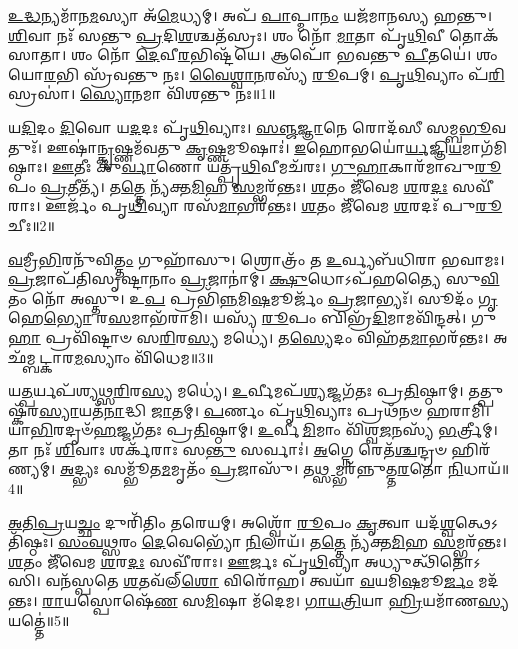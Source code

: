 \setcounter{anuvakam}{0}

\-\ul{𑌉}\-\-\ul{𑌦𑍍𑌧}\-𑌨𑍍𑌯𑌮𑌾᳴𑌨\-\ul{𑌮}\-𑌸𑍍𑌯𑌾 𑌅᳴\-\ul{𑌮𑍇}\-𑌧𑍍𑌯𑌮𑍍।
𑌅𑌪᳴ \ul{𑌪𑌾}\-𑌪𑍍𑌮𑌾\-\ul{𑌨𑌂} 𑌯𑌜᳴𑌮𑌾𑌨𑌸𑍍𑌯 𑌹𑌨𑍍𑌤𑍁।
\-\ul{𑌶𑌿}\-𑌵𑌾 𑌨𑌃᳴ 𑌸𑌨𑍍𑌤𑍁 \ul{𑌪𑍍𑌰}\-𑌦𑌿\-\ul{𑌶}\-𑌶𑍍𑌚𑌤᳴𑌸𑍍𑌰𑌃।
𑌶𑌂 𑌨𑍋᳴ \ul{𑌮𑌾}\-𑌤𑌾 𑌪𑍃᳴\-\ul{𑌥𑌿}\-𑌵𑍀 𑌤𑍋𑌕᳴𑌸𑌾𑌤𑌾।
𑌶𑌂 𑌨𑍋᳴ \ul{𑌦𑍇}\-𑌵𑍀\-\ul{𑌰}\-𑌭𑌿𑌷𑍍𑌟᳴𑌯𑍇।
𑌆𑌪𑍋᳴ 𑌭𑌵𑌨𑍍𑌤𑍁 \ul{𑌪𑍀}\-𑌤𑌯𑍇॑।
𑌶𑌂 𑌯𑍋\-\ul{𑌰}\-𑌭𑌿 𑌸𑍍𑌰᳴𑌵𑌨𑍍𑌤𑍁 𑌨𑌃।
\-\ul{𑌵𑍈}\-\-\ul{𑌶𑍍𑌵𑌾}\-\-\ul{𑌨}\-𑌰𑌸𑍍𑌯᳴ \ul{𑌰𑍂}\-𑌪𑌮𑍍।
\-\ul{𑌪𑍃}\-\-\ul{𑌥𑌿}\-𑌵𑍍𑌯𑌾𑌂 𑌪᳴\-\ul{𑌰𑌿}\-𑌸𑍍𑌰𑌸𑌾॑।
\-\ul{𑌸𑍍𑌯𑍋}\-𑌨𑌮𑌾 𑌵𑌿᳴𑌶𑌨𑍍𑌤𑍁 𑌨𑌃॥1॥

𑌯\-\ul{𑌦𑌿}\-𑌦𑌂 \ul{𑌦𑌿}\-𑌵𑍋 𑌯\-\ul{𑌦}\-𑌦𑌃 𑌪𑍃᳴\-\ul{𑌥𑌿}\-𑌵𑍍𑌯𑌾𑌃।
\-\ul{𑌸}\-\-\ul{𑌞𑍍𑌜}\-\-\ul{𑌜𑍍𑌞𑌾}\-𑌨𑍇 𑌰𑍋𑌦᳴𑌸𑍀 𑌸𑌮𑍍𑌬\-\ul{𑌭𑍂}\-𑌵𑌤𑍁𑌃᳴।
𑌊𑌷𑌾॑\-\ul{𑌨𑍍𑌕𑍃}\-𑌷𑍍𑌣𑌮᳴𑌵𑌤𑍁 \ul{𑌕𑍃}\-𑌷𑍍𑌣𑌮𑍂𑌷𑌾𑌃॑।
\-\ul{𑌇}\-𑌹𑍋𑌭𑌯𑍋॑\-\ul{𑌰𑍍𑌯}\-𑌜𑍍𑌞𑌿\-\ul{𑌯}\-\-𑌮𑌾𑌗᳴𑌮𑌿𑌷𑍍𑌠𑌾𑌃।
\-\ul{𑌊}\-𑌤𑍀𑌃 𑌕𑍁᳴\-\ul{𑌰𑍍𑌵𑌾}\-𑌣𑍋 𑌯𑌤𑍍𑌪𑍃᳴\-\ul{𑌥𑌿}\-𑌵𑍀𑌮𑌚᳴𑌰𑌃।
\-\ul{𑌗𑍁}\-\-\ul{𑌹𑌾}\-𑌕𑌾𑌰᳴𑌮𑌾𑌖𑍁\-\ul{𑌰𑍂}\-𑌪𑌂 \ul{𑌪𑍍𑌰}\-𑌤𑍀𑌤𑍍𑌯᳴।
𑌤\-\ul{𑌤𑍍𑌤𑍇} 𑌨𑍍𑌯᳴𑌕𑍍𑌤\-\ul{𑌮𑌿}\-𑌹 \ul{𑌸}\-𑌮𑍍𑌭𑌰᳴𑌨𑍍𑌤𑌃।
\-\ul{𑌶}\-𑌤𑌂 𑌜𑍀᳴𑌵𑍇𑌮 \ul{𑌶}\-𑌰\-\ul{𑌦𑌃} 𑌸𑌵𑍀᳴𑌰𑌾𑌃।
𑌊𑌰𑍍𑌜𑌂᳴ 𑌪𑍃\-\ul{𑌥𑌿}\-𑌵𑍍𑌯𑌾 𑌰𑌸᳴\-\ul{𑌮𑌾}\-𑌭𑌰᳴𑌨𑍍𑌤𑌃।
\-\ul{𑌶}\-𑌤𑌂 𑌜𑍀᳴𑌵𑍇𑌮 \ul{𑌶}\-𑌰𑌦𑌃᳴ 𑌪𑍁\-\ul{𑌰𑍂}\-𑌚𑍀𑌃॥2॥

\-\ul{𑌵}\-𑌮𑍍𑌰𑍀\-\ul{𑌭𑌿}\-𑌰𑌨𑍁᳴\-𑌵𑌿\-\ul{𑌤𑍍𑌤𑌂} 𑌗𑍁𑌹𑌾᳴𑌸𑍁।
𑌶𑍍𑌰𑍋𑌤𑍍𑌰𑌂᳴ 𑌤 \ul{𑌉}\-𑌰𑍍𑌵𑍍𑌯𑌬᳴𑌧𑌿𑌰𑌾 𑌭𑌵𑌾𑌮𑌃।
\-\ul{𑌪𑍍𑌰}\-𑌜𑌾𑌪᳴𑌤𑌿𑌸𑍃𑌷𑍍𑌟𑌾𑌨𑌾𑌂 \ul{𑌪𑍍𑌰}\-𑌜𑌾𑌨𑌾॑𑌮𑍍।
\-\ul{𑌕𑍍𑌷𑍁}\-𑌧𑍋\-𑌽𑌪᳴𑌹𑌤𑍍𑌯𑍈 𑌸𑍁\-\ul{𑌵𑌿}\-𑌤𑌂 𑌨𑍋᳴ 𑌅𑌸𑍍𑌤𑍁।
𑌉\-\ul{𑌪} 𑌪𑍍𑌰𑌭𑌿᳴\-\ul{𑌨𑍍𑌨}\-𑌮𑌿\-\ul{𑌷}\-𑌮𑍂𑌰𑍍𑌜𑌂᳴ \ul{𑌪𑍍𑌰}\-𑌜𑌾𑌭𑍍𑌯𑌃᳴।
𑌸𑍂𑌦𑌂᳴ \ul{𑌗𑍃}\-𑌹𑍇\-\ul{𑌭𑍍𑌯𑍋} 𑌰\-\ul{𑌸}\-𑌮𑌾𑌭᳴𑌰𑌾𑌮𑌿।
𑌯𑌸𑍍𑌯᳴ \ul{𑌰𑍂}\-𑌪𑌂 𑌬𑌿𑌭𑍍𑌰᳴\-\ul{𑌦𑌿}\-𑌮𑌾𑌮𑌵𑌿᳴𑌨𑍍𑌦𑌤𑍍।
𑌗𑍁\-\ul{𑌹𑌾} 𑌪𑍍𑌰𑌵𑌿᳴𑌷𑍍𑌟𑌾𑍞 𑌸\-\ul{𑌰𑌿}\-𑌰\-\ul{𑌸𑍍𑌯} 𑌮𑌧𑍍𑌯𑍇॑।
𑌤\-\ul{𑌸𑍍𑌯𑍇}\-𑌦𑌂 𑌵𑌿𑌹᳴𑌤\-\ul{𑌮𑌾}\-𑌭𑌰᳴𑌨𑍍𑌤𑌃।
𑌅𑌛᳴𑌮𑍍𑌬𑌟𑍍𑌕𑌾𑌰\-\ul{𑌮}\-𑌸𑍍𑌯𑌾𑌂 𑌵𑌿᳴𑌧𑍇𑌮॥3॥

𑌯\-\ul{𑌤𑍍𑌪}\-𑌰𑍍𑌯𑌪᳴𑌶𑍍𑌯𑌥𑍍𑌸\-\ul{𑌰𑌿}\-𑌰\-\ul{𑌸𑍍𑌯} 𑌮𑌧𑍍𑌯𑍇॑।
\-\ul{𑌉}\-𑌰𑍍𑌵𑍀𑌮𑌪᳴\-\ul{𑌶𑍍𑌯}\-𑌜𑍍𑌜𑌗᳴𑌤𑌃 𑌪𑍍𑌰\-\ul{𑌤𑌿}\-𑌷𑍍𑌠𑌾𑌮𑍍।
𑌤𑌤𑍍𑌪𑍁𑌷𑍍𑌕᳴𑌰\-\ul{𑌸𑍍𑌯𑌾}\-𑌯𑌤᳴\-\ul{𑌨𑌾}\-𑌦𑍍𑌧𑌿 \ul{𑌜𑌾}\-𑌤𑌮𑍍।
\-\ul{𑌪}\-𑌰𑍍𑌣𑌂 𑌪𑍃᳴\-\ul{𑌥𑌿}\-𑌵𑍍𑌯𑌾𑌃 𑌪𑍍𑌰𑌥᳴𑌨𑍞 𑌹𑌰𑌾𑌮𑌿।
𑌯𑌾\-\ul{𑌭𑌿}\-𑌰𑌦𑍃𑍞᳴\-\ul{𑌹}\-𑌜𑍍𑌜𑌗᳴𑌤𑌃 𑌪𑍍𑌰\-\ul{𑌤𑌿}\-𑌷𑍍𑌠𑌾𑌮𑍍।
\-\ul{𑌉}\-𑌰𑍍𑌵𑍀\-\ul{𑌮𑌿}\-𑌮𑌾𑌂 𑌵𑌿᳴𑌶𑍍𑌵\-\ul{𑌜}\-𑌨𑌸𑍍𑌯᳴ \ul{𑌭}\-𑌰𑍍𑌤𑍍𑌰𑍀𑌮𑍍।
𑌤𑌾 𑌨𑌃᳴ \ul{𑌶𑌿}\-𑌵𑌾𑌃 𑌶𑌰𑍍𑌕᳴𑌰𑌾𑌃 𑌸\-\ul{𑌨𑍍𑌤𑍁} 𑌸𑌰𑍍𑌵𑌾𑌃॑।
\-\ul{𑌅}\-𑌗𑍍𑌨𑍇 𑌰𑍇𑌤᳴\-\ul{𑌶𑍍𑌚}\-𑌨𑍍𑌦𑍍𑌰𑍞 𑌹𑌿𑌰᳴𑌣𑍍𑌯𑌮𑍍।
\-\ul{𑌅}\-𑌦𑍍𑌭𑍍𑌯𑌃 𑌸𑌮𑍍𑌭𑍂᳴𑌤\-\ul{𑌮}\-𑌮𑍃𑌤𑌂᳴ \ul{𑌪𑍍𑌰}\-𑌜𑌾𑌸𑍁᳴।
𑌤\-\ul{𑌥𑍍𑌸}\-𑌮𑍍𑌭𑌰᳴𑌨𑍍𑌨𑍁𑌤𑍍𑌤\-\ul{𑌰}\-𑌤𑍋 \ul{𑌨𑌿}\-𑌧𑌾𑌯᳴॥4॥

\-\ul{𑌅}\-\-\ul{𑌤𑌿}\-\-\ul{𑌪𑍍𑌰}\-𑌯\-\ul{𑌚𑍍𑌛𑌂} 𑌦𑍁𑌰𑌿᳴𑌤𑌿𑌂 𑌤𑌰𑍇𑌯𑌮𑍍।
𑌅𑌶𑍍𑌵𑍋᳴ \ul{𑌰𑍂}\-𑌪𑌂 \ul{𑌕𑍃}\-𑌤𑍍𑌵𑌾 𑌯𑌦᳴\-\ul{𑌶𑍍𑌵}\-𑌤𑍍𑌥𑍇\-𑌽𑌤𑌿᳴𑌷𑍍𑌠𑌃।
\-\ul{𑌸𑌂}\-\-\ul{𑌵}\-\-\ul{𑌥𑍍𑌸}\-𑌰𑌂 \ul{𑌦𑍇}\-𑌵𑍇𑌭𑍍𑌯𑍋᳴ \ul{𑌨𑌿}\-𑌲𑌾𑌯᳴।
𑌤\-\ul{𑌤𑍍𑌤𑍇} 𑌨𑍍𑌯᳴𑌕𑍍𑌤\-\ul{𑌮𑌿}\-𑌹 \ul{𑌸}\-𑌮𑍍𑌭𑌰᳴𑌨𑍍𑌤𑌃।
\-\ul{𑌶}\-𑌤𑌂 𑌜𑍀᳴𑌵𑍇𑌮 \ul{𑌶}\-𑌰\-\ul{𑌦𑌃} 𑌸𑌵𑍀᳴𑌰𑌾𑌃।
\-\ul{𑌊}\-𑌰𑍍𑌜𑌃 𑌪𑍃᳴\-\ul{𑌥𑌿}\-𑌵𑍍𑌯𑌾 𑌅𑌧𑍍𑌯𑍁𑌤𑍍𑌥𑌿᳴𑌤𑍋𑌽𑌸𑌿।
𑌵𑌨᳴𑌸𑍍𑌪𑌤𑍇 \ul{𑌶}\-𑌤𑌵᳴𑌲𑍍‌\-\ul{𑌶𑍋} 𑌵𑌿𑌰𑍋᳴𑌹।
𑌤𑍍𑌵𑌯𑌾᳴ \ul{𑌵}\-𑌯𑌮𑌿\-\ul{𑌷}\-𑌮𑍂\-\ul{𑌰𑍍𑌜𑌂} 𑌮𑌦᳴𑌨𑍍𑌤𑌃।
\-\ul{𑌰𑌾}\-𑌯𑌸𑍍𑌪𑍋𑌷𑍇᳴\-\ul{𑌣} 𑌸\-\ul{𑌮𑌿}\-𑌷𑌾 𑌮᳴𑌦𑍇𑌮।
\-\ul{𑌗𑌾}\-\-\ul{𑌯}\-\-\ul{𑌤𑍍𑌰𑌿}\-𑌯𑌾 \ul{𑌹𑍍𑌰𑌿}\-𑌯𑌮𑌾᳴𑌣\-\ul{𑌸𑍍𑌯} 𑌯𑌤𑍍𑌤𑍇॑॥5॥

